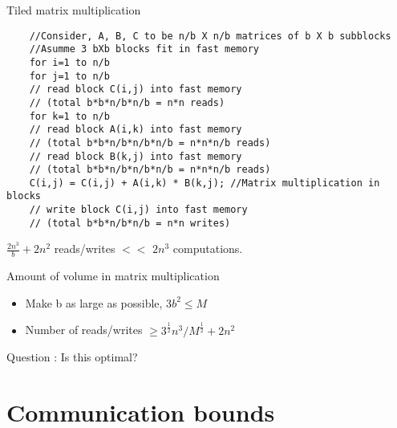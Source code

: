 \documentclass[
11pt, %
]{beamer}
\newcommand{\brown}[1]{{\color{brown} #1 }}
\begin{document}
\begin{frame}[fragile]{Tiled matrix multiplication}
	\begin{verbatim}
	//Consider, A, B, C to be n/b X n/b matrices of b X b subblocks
	//Asumme 3 bXb blocks fit in fast memory
	for i=1 to n/b
	for j=1 to n/b
	// read block C(i,j) into fast memory 
	// (total b*b*n/b*n/b = n*n reads)
	for k=1 to n/b
	// read block A(i,k) into fast memory 
	// (total b*b*n/b*n/b*n/b = n*n*n/b reads)
	// read block B(k,j) into fast memory 
	// (total b*b*n/b*n/b*n/b = n*n*n/b reads)
	C(i,j) = C(i,j) + A(i,k) * B(k,j); //Matrix multiplication in blocks
	// write block C(i,j) into fast memory 
	// (total b*b*n/b*n/b = n*n writes)
	\end{verbatim}
	\medskip
	$\frac{2n^3}{b} + 2n^2$ reads/writes $<<$ $2n^3$ computations.
\end{frame}

\begin{frame}{Amount of volume in matrix multiplication }
	\begin{itemize}
		\item Make b as large as possible, 3$b^2 \le M$
		\item Number of reads/writes $\ge 3^\frac{1}{2}n^3/M^\frac{1}{2} + 2n^2$
	\end{itemize}
	\vfill
	\brown{Question}: Is this optimal?

\end{frame}

\section{Communication bounds}
\end{document}
